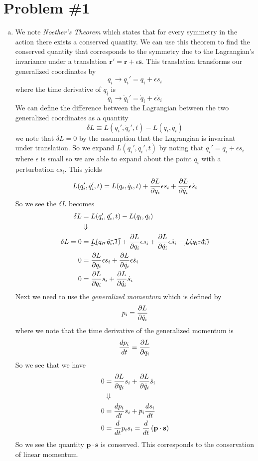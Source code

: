 \documentclass[11pt]{article}
\numberwithin{equation}{section}
\begin{document}


\section{Problem \#1}
\begin{enumerate}[(a)]
\item We note \emph{Noether's Theorem} which states that for every symmetry in the action
there exists a conserved quantity. We can use this theorem to find the conserved quantity 
that corresponds to the symmetry due to the Lagrangian's invariance under a translation
$\mathbf{r'} = \mathbf{r}+\epsilon\mathbf{s}$. This translation transforms our generalized 
coordinates by
$$q_i \rightarrow q_i' = q_i+\epsilon s_i$$
where the time derivative of $q_i$ is
$$\dot{q}_i \rightarrow \dot{q}_i' = \dot{q}_i+\epsilon \dot{s}_i$$
We can define the difference between the Lagrangian between the two generalized coordinates
as a quantity 
$$\delta{L} \equiv L(q_i',\dot{q}_i',t) - L(q_i,\dot{q}_i)$$
we note that $\delta{L}=0$ by the assumption that the Lagrangian is invariant under 
translation. So we expand $L(q_i',\dot{q}_i',t)$ by noting that $q_i'=q_i+\epsilon s_i$ where
$\epsilon$ is small so we are able to expand about the point $q_i$ with a perturbation 
$\epsilon s_i$. This yields
$$L(q_i',\dot{q}_i',t) = L(q_i,\dot{q}_i,t) + \frac{\partial{L}}{\partial{q_i}}\epsilon{s_i} + \frac{\partial{L}}{\partial{\dot{q}_i}}\epsilon\dot{s}_i$$
So we see the $\delta{L}$ becomes
\begin{align*}
\delta{L} &= L(q_i',\dot{q}_i',t) - L(q_i,\dot{q}_i)\\
&\Downarrow\\
\delta{L} = 0 &=\cancel{L(q_i,\dot{q}_i,t)} + \frac{\partial{L}}{\partial{q_i}}\epsilon{s_i} + \frac{\partial{L}}{\partial{\dot{q}_i}}\epsilon\dot{s}_i - \cancel{L(q_i,\dot{q}_i)}\\
0 &= \frac{\partial{L}}{\partial{q_i}}\epsilon{s_i} + \frac{\partial{L}}{\partial{\dot{q}_i}}\epsilon\dot{s}_i \\
0 &= \frac{\partial{L}}{\partial{q_i}}s_i + \frac{\partial{L}}{\partial{\dot{q}_i}}\dot{s}_i 
\end{align*}
Next we need to use the \emph{generalized momentum} which is defined by 
$$p_i = \frac{\partial{L}}{\partial{\dot{q}_i}}$$
where we note that the time derivative of the generalized momentum is
$$\frac{dp_i}{dt} = \frac{\partial{L}}{\partial{q_i}}$$
So we see that we have
\begin{align*}
0 &= \frac{\partial{L}}{\partial{q_i}}s_i + \frac{\partial{L}}{\partial{\dot{q}_i}}\dot{s}_i\\
&\Downarrow\\
0 &= \frac{dp_i}{dt}s_i + p_i\frac{ds_i}{dt}\\
0 &= \frac{d}{dt}p_is_i = \frac{d}{dt}\left(\mathbf{p}\cdot\mathbf{s}\right)
\end{align*}
So we see the quantity $\mathbf{p}\cdot\mathbf{s}$ is conserved. This corresponds to the 
conservation of linear momentum.


\end{enumerate}
\end{document}
